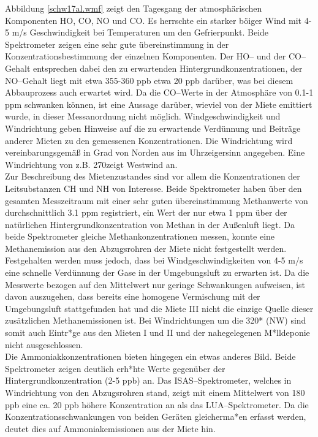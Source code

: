 Abbildung \ref{schw17al.wmf} zeigt den Tagesgang der
atmosphärischen Komponenten HO, CO, NO und
CO. Es herrschte ein starker böiger Wind mit 4-5 m/s
Geschwindigkeit bei Temperaturen um den Gefrierpunkt. Beide
Spektrometer zeigen eine sehr gute übereinstimmung in der
Konzentrationsbestimmung der einzelnen Komponenten. Der
HO-- und der CO--Gehalt entsprechen dabei den zu
erwartenden Hintergrundkonzentrationen, der NO--Gehalt
liegt mit etwa 355-360 ppb etwa 20 ppb darüber, was bei diesem
Abbauprozess auch erwartet wird. Da die CO--Werte in der
Atmosphäre von 0.1-1 ppm schwanken können, ist eine Aussage
darüber, wieviel von der Miete emittiert wurde, in dieser
Messanordnung nicht möglich. Windgeschwindigkeit und Windrichtung
geben Hinweise auf die zu erwartende Verdünnung und Beiträge
anderer Mieten zu den gemessenen Konzentrationen. Die Windrichtung
wird vereinbarungsgemäß in Grad von Norden aus im Uhrzeigersinn
angegeben. Eine Windrichtung von z.B. 270\degree zeigt Westwind an.\\

Zur Beschreibung des Mietenzustandes sind vor allem die
Konzentrationen der Leitsubstanzen CH und NH von
Interesse. Beide Spektrometer haben über den gesamten Messzeitraum
mit einer sehr guten übereinstimmung Methanwerte von
durchschnittlich 3.1 ppm registriert, ein Wert der nur etwa 1 ppm
über der natürlichen Hintergrundkonzentration von Methan in der
Außenluft liegt. Da beide Spektrometer gleiche
Methankonzentrationen messen, konnte eine Methanemission aus den
Abzugsrohren der Miete nicht festgestellt werden. Festgehalten
werden muss jedoch, dass bei Windgeschwindigkeiten von 4-5 m/s
eine schnelle Verdünnung der Gase in der Umgebungsluft zu erwarten
ist. Da die Messwerte bezogen auf den Mittelwert nur geringe
Schwankungen aufweisen, ist davon auszugehen, dass bereits eine
homogene Vermischung mit der Umgebungsluft stattgefunden hat und
die Miete III nicht die einzige Quelle dieser zusätzlichen
Methanemissionen ist. Bei Windrichtungen um die 320* (NW) sind
somit auch Eintr*ge aus den Mieten I und II und der nahegelegenen
M*lldeponie nicht ausgeschlossen.\\

Die Ammoniakkonzentrationen bieten hingegen ein etwas anderes
Bild. Beide Spektrometer zeigen deutlich erh*hte Werte gegenüber
der Hintergrundkonzentration (2-5 ppb) an. Das ISAS--Spektrometer,
welches in Windrichtung von den Abzugsrohren stand, zeigt mit
einem Mittelwert von 180 ppb eine ca. 20 ppb höhere Konzentration
an als das LUA--Spektrometer. Da die Konzentrationsschwankungen
von beiden Geräten gleicherma*en erfasst werden, deutet dies auf
Ammoniakemissionen aus der Miete hin.\\


